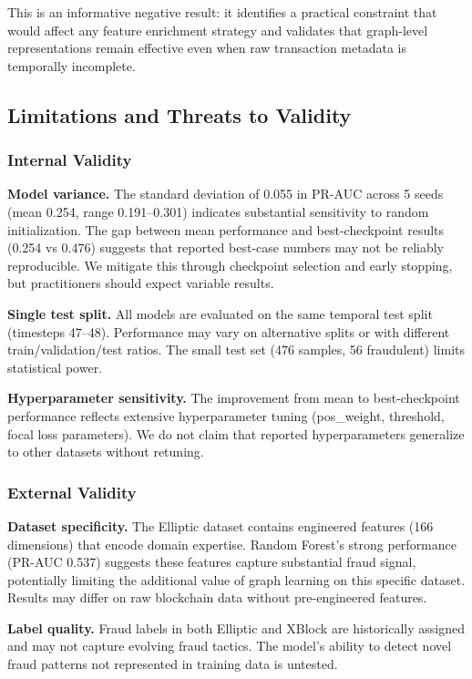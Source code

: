 \documentclass[12pt,a4paper]{article}
\begin{document}
This is an informative negative result: it identifies a practical constraint that would affect any feature enrichment strategy and validates that graph-level representations remain effective even when raw transaction metadata is temporally incomplete.

\subsection{Limitations and Threats to Validity}

\subsubsection{Internal Validity}
\textbf{Model variance.} The standard deviation of 0.055 in PR-AUC across 5 seeds (mean 0.254, range 0.191--0.301) indicates substantial sensitivity to random initialization. The gap between mean performance and best-checkpoint results (0.254 vs 0.476) suggests that reported best-case numbers may not be reliably reproducible. We mitigate this through checkpoint selection and early stopping, but practitioners should expect variable results.

\textbf{Single test split.} All models are evaluated on the same temporal test split (timesteps 47--48). Performance may vary on alternative splits or with different train/validation/test ratios. The small test set (476 samples, 56 fraudulent) limits statistical power.

\textbf{Hyperparameter sensitivity.} The improvement from mean to best-checkpoint performance reflects extensive hyperparameter tuning (pos\_weight, threshold, focal loss parameters). We do not claim that reported hyperparameters generalize to other datasets without retuning.

\subsubsection{External Validity}
\textbf{Dataset specificity.} The Elliptic dataset contains engineered features (166 dimensions) that encode domain expertise. Random Forest's strong performance (PR-AUC 0.537) suggests these features capture substantial fraud signal, potentially limiting the additional value of graph learning on this specific dataset. Results may differ on raw blockchain data without pre-engineered features.

\textbf{Label quality.} Fraud labels in both Elliptic and XBlock are historically assigned and may not capture evolving fraud tactics. The model's ability to detect novel fraud patterns not represented in training data is untested.
\end{document}
